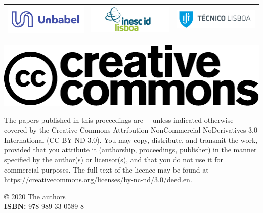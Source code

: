 \documentclass[a4paper,11pt,twoside]{book}
\newcommand{\newoddpage} {\clearpage
  \ifthenelse{\isodd{\value{page}}}{}
  {\thispagestyle{empty}\quad\newpage}}
\begin{document}
\begin{center}
\vspace{1em}
\begin{tabular}{ccc}
\includegraphics[width=0.30\columnwidth]{logos/unbabel-logo.png} & \includegraphics[width=0.30\columnwidth]{logos/inescid-logo.png} & \includegraphics[width=0.30\columnwidth]{logos/ist-logo.png}\\
\end{tabular}
\end{center}

\newoddpage
\thispagestyle{empty}
\vfill \mbox{} \vfill

\begin{onehalfspacing}

\noindent \includegraphics[scale=0.5]{logos/creative_commons.pdf} 
\vspace{1em}

\noindent 
The papers published in this proceedings are ---unless indicated
otherwise--- covered by the Creative Commons
Attribution-NonCommercial-NoDerivatives 3.0 International (CC-BY-ND
3.0). You may copy, distribute, and transmit the work, provided that
you attribute it (authorship, proceedings, publisher) in the manner
specified by the author(s) or licensor(s), and that you do not use it
for commercial purposes. The full text of the licence may be found at
\url{https://creativecommons.org/licenses/by-nc-nd/3.0/deed.en}.

\vspace{1cm}

\noindent © 2020 The authors\\
\noindent \textbf{ISBN:} 978-989-33-0589-8\\

\end{onehalfspacing}
\end{document}
